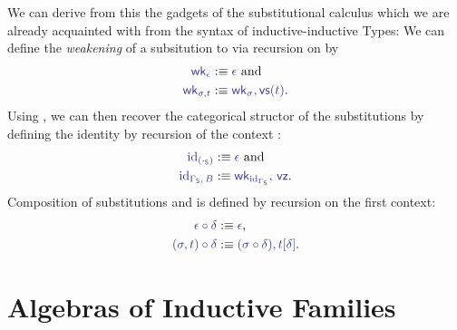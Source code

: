 \begin{defn}
We can derive from this the gadgets of the substitutional calculus which we
are already acquainted with from the syntax of inductive-inductive Types:
We can define the \emph{weakening} of a subsitution
\tqm{\IFSub{\sigma}{\Gamma_\Sc}{\Delta_\Sc}} to 
 via recursion on \tqm{\sigma} by
\begin{align*}
\tqm{\wk_\epsilon} 				&:\equiv \tqm{\epsilon} \text{ and} \\
\tqm{\wk_{\sigma, t}}				&:\equiv \tqm{\wk_\sigma, \vs(t)} \text{.}
\end{align*}
Using \tqm{\wk}, we can then recover the categorical structor of the substitutions
by defining the identity \tqm{\IFSub{\id_{\Gamma_\Sc}}{\Gamma_\Sc}{\Gamma_\Sc}}
by recursion of the context \tqm{\Gamma_\Sc}:
\begin{align*}
\tqm{\id_{(\cdot_\Sc)}}				&:\equiv \tqm{\epsilon} \text{ and} \\
\tqm{\id_{\Gamma_\Sc,\, B}}			&:\equiv \tqm{\wk_{\id_{\Gamma_\Sc}},\, \vz} \text{.}
\end{align*}
Composition \tqm{\IFSub{\sigma \circ \delta}{\Gamma_\Sc}{\Sigma_\Sc}} of substitutions
\tqm{\IFSub{\sigma}{\Delta_\Sc}{\Sigma_\Sc}} and \tqm{\IFSub{\delta}{\Gamma_\Sc}{\Delta_\Sc}}
is defined by recursion on the first context:
\begin{align*}
\tqm{\epsilon \circ \delta}			&:\equiv \tqm{\epsilon} \text{,} \\
\tqm{(\sigma, t) \circ \delta}			&:\equiv \tqm{(\sigma \circ \delta), t[\delta]} \text{.}
\end{align*}
\end{defn}




\section{Algebras of Inductive Families}



